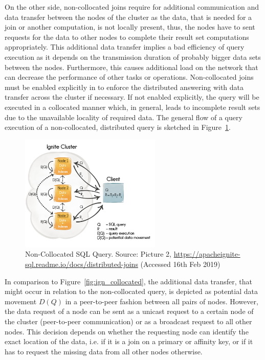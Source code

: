 On the other side, non-collocated joins require for additional communication and data transfer between the nodes of the cluster as the data, that is needed
for a join or another computation, is not locally present, thus, the nodes have to sent requests for the data to other nodes to complete their result set 
computations appropriately. This additional data transfer implies a bad efficiency of query execution as it depends on the transmission duration of
probably bigger data sets between the nodes. Furthermore, this causes additional load on the network that can decrease the performance of other tasks or
operations. Non-collocated joins must be enabled explicitly in  to enforce the distributed answering with data transfer across the
cluster if necessary. If not enabled explicitly, the query will be executed in a collocated manner which, in general, leads to incomplete result sets due
to the unavailable locality of required data. The general flow of a query execution of a non-collocated, distributed query is sketched in
Figure~\ref{fig:ign_noncoll}. 
\begin{figure}[ht]
    \centering
    \includegraphics[width=0.6\textwidth,keepaspectratio=true]{img/95f09db-Non_collocated_sql_queries.png}
    \caption{Non-Collocated SQL Query. Source: Picture 2, \protect\url{https://apacheignite-sql.readme.io/docs/distributed-joins} (Accessed 16th Feb 2019)}
    \label{fig:ign_noncoll}
\end{figure}
 
In comparison to Figure~\ref{fig:ign_collocated}, the additional data transfer, that might occur in relation to the non-collocated query, is depicted as
potential data movement $D(Q)$ in a peer-to-peer fashion between all pairs of nodes. However, the data request of a node can be sent as a unicast request 
to a certain node of the cluster (peer-to-peer communication) or as a broadcast request to all other nodes. This decision depends on whether the 
requesting node can identify the exact location of the data, i.e. if it is a join on a primary or affinity key, or if it has to request the missing data
from all other nodes otherwise. 

